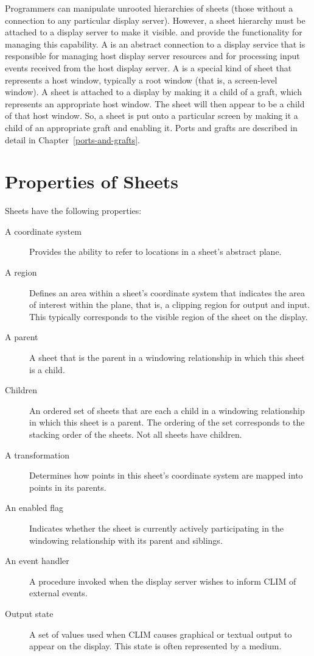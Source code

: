 Programmers can manipulate unrooted hierarchies of sheets (those without a
connection to any particular display server).  However, a sheet hierarchy must
be attached to a display server to make it visible.   and
 provide the functionality for managing this capability.  A
 is an abstract connection to a display service that is responsible
for managing host display server resources and for processing input events
received from the host display server.  A  is a special kind of
sheet that represents a host window, typically a root window (that is, a
screen-level window).  A sheet is attached to a display by making it a child of
a graft, which represents an appropriate host window.  The sheet will then
appear to be a child of that host window.  So, a sheet is put onto a particular
screen by making it a child of an appropriate graft and enabling it.  Ports and
grafts are described in detail in Chapter~\ref{ports-and-grafts}.


\section {Properties of Sheets}

Sheets have the following properties:

\begin{description}
\item [A coordinate system] Provides the ability to refer to locations in a
sheet's abstract plane.

\item [A region] Defines an area within a sheet's coordinate system that
indicates the area of interest within the plane, that is, a clipping region for
output and input.  This typically corresponds to the visible region of the sheet
on the display.

\item [A parent] A sheet that is the parent in a windowing relationship in which
this sheet is a child.

\item [Children] An ordered set of sheets that are each a child in a windowing
relationship in which this sheet is a parent.  The ordering of the set
corresponds to the stacking order of the sheets.  Not all sheets have children.

\item [A transformation] Determines how points in this sheet's coordinate system
are mapped into points in its parents.

\item [An enabled flag] Indicates whether the sheet is currently actively
participating in the windowing relationship with its parent and siblings.

\item [An event handler] A procedure invoked when the display server wishes to
inform CLIM of external events.

\item [Output state] A set of values used when CLIM causes graphical or textual
output to appear on the display.  This state is often represented by a medium.
\end{description}


